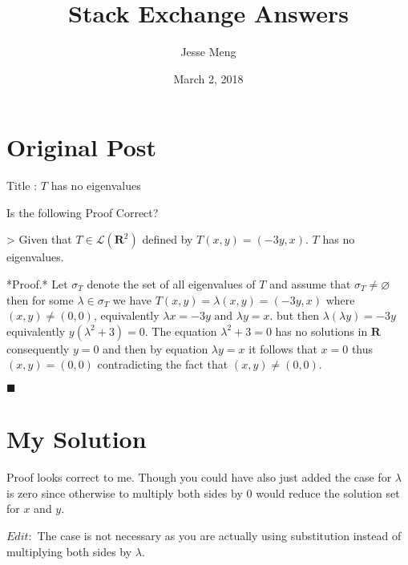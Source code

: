\documentclass{article}
\title{Stack Exchange Answers}
\author{Jesse Meng }
\date{March 2, 2018}
\begin{document}
\maketitle

\section{Original Post}
Title : $T$ has no eigenvalues

Is the following Proof Correct?

>  Given that $T\in\mathcal{L}(\mathbf{R}^2)$ defined by $T(x,y) =
 (-3y,x)$. $T$ has no eigenvalues.

*Proof.* Let $\sigma_T$ denote the set of all eigenvalues of $T$ and assume that $\sigma_T\neq\varnothing$ then for some $\lambda\in\sigma_T$ we have $T(x,y) = \lambda(x,y) = (-3y,x)$ where $(x,y)\neq (0,0)$, equivalently $\lambda x = -3y\text{ and }\lambda y = x$. but then $\lambda(\lambda y) = -3y$ equivalently $y(\lambda^2+3) = 0$. The equation $\lambda^2+3 = 0$ has no solutions in $\mathbf{R}$ consequently $y=0$ and then by equation $\lambda y  = x$ it follows that $x=0$  thus $(x,y) = (0,0)$ contradicting the fact that $(x,y)\neq (0,0)$.

$\blacksquare$
\section{My Solution}
Proof looks correct to me. Though you could have also just added the case for $\lambda$ is zero since otherwise to multiply both sides by $0$ would reduce the solution set for $x$ and $y$.

$Edit:$ The case is not necessary as you are actually using substitution instead of multiplying both sides by $\lambda$.
\end{document}
